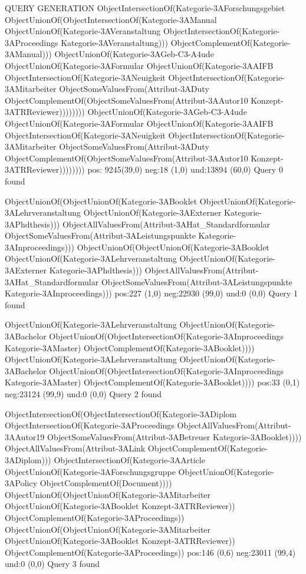 QUERY GENERATION
ObjectIntersectionOf(Kategorie-3AForschungsgebiet ObjectUnionOf(ObjectIntersectionOf(Kategorie-3AManual ObjectUnionOf(Kategorie-3AVeranstaltung ObjectIntersectionOf(Kategorie-3AProceedings Kategorie-3AVeranstaltung))) ObjectComplementOf(Kategorie-3AManual)))
ObjectUnionOf(Kategorie-3AGeb-C3-A4ude ObjectUnionOf(Kategorie-3AFormular ObjectUnionOf(Kategorie-3AAIFB ObjectIntersectionOf(Kategorie-3ANeuigkeit ObjectIntersectionOf(Kategorie-3AMitarbeiter ObjectSomeValuesFrom(Attribut-3ADuty ObjectComplementOf(ObjectSomeValuesFrom(Attribut-3AAutor10 Konzept-3ATRReviewer))))))))
ObjectUnionOf(Kategorie-3AGeb-C3-A4ude ObjectUnionOf(Kategorie-3AFormular ObjectUnionOf(Kategorie-3AAIFB ObjectIntersectionOf(Kategorie-3ANeuigkeit ObjectIntersectionOf(Kategorie-3AMitarbeiter ObjectSomeValuesFrom(Attribut-3ADuty ObjectComplementOf(ObjectSomeValuesFrom(Attribut-3AAutor10 Konzept-3ATRReviewer))))))))
pos: 9245(39,0)		 neg:18 (1,0)		 und:13894 (60,0)
Query 0 found

ObjectUnionOf(ObjectUnionOf(Kategorie-3ABooklet ObjectUnionOf(Kategorie-3ALehrveranstaltung ObjectUnionOf(Kategorie-3AExterner Kategorie-3APhdthesis))) ObjectAllValuesFrom(Attribut-3AHat_Standardformular ObjectSomeValuesFrom(Attribut-3ALeistungspunkte Kategorie-3AInproceedings)))
ObjectUnionOf(ObjectUnionOf(Kategorie-3ABooklet ObjectUnionOf(Kategorie-3ALehrveranstaltung ObjectUnionOf(Kategorie-3AExterner Kategorie-3APhdthesis))) ObjectAllValuesFrom(Attribut-3AHat_Standardformular ObjectSomeValuesFrom(Attribut-3ALeistungspunkte Kategorie-3AInproceedings)))
pos:227 (1,0)		 neg:22930 (99,0)		 und:0 (0,0)
Query 1 found

ObjectUnionOf(Kategorie-3ALehrveranstaltung ObjectUnionOf(Kategorie-3ABachelor ObjectUnionOf(ObjectIntersectionOf(Kategorie-3AInproceedings Kategorie-3AMaster) ObjectComplementOf(Kategorie-3ABooklet))))
ObjectUnionOf(Kategorie-3ALehrveranstaltung ObjectUnionOf(Kategorie-3ABachelor ObjectUnionOf(ObjectIntersectionOf(Kategorie-3AInproceedings Kategorie-3AMaster) ObjectComplementOf(Kategorie-3ABooklet))))
pos:33 (0,1)		 neg:23124 (99,9)		 und:0 (0,0)
Query 2 found

ObjectIntersectionOf(ObjectIntersectionOf(Kategorie-3ADiplom ObjectIntersectionOf(Kategorie-3AProceedings ObjectAllValuesFrom(Attribut-3AAutor19 ObjectSomeValuesFrom(Attribut-3ABetreuer Kategorie-3ABooklet)))) ObjectAllValuesFrom(Attribut-3ALink ObjectComplementOf(Kategorie-3ADiplom)))
ObjectIntersectionOf(Kategorie-3AArticle ObjectUnionOf(Kategorie-3AForschungsgruppe ObjectUnionOf(Kategorie-3APolicy ObjectComplementOf(Document))))
ObjectUnionOf(ObjectUnionOf(Kategorie-3AMitarbeiter ObjectUnionOf(Kategorie-3ABooklet Konzept-3ATRReviewer)) ObjectComplementOf(Kategorie-3AProceedings))
ObjectUnionOf(ObjectUnionOf(Kategorie-3AMitarbeiter ObjectUnionOf(Kategorie-3ABooklet Konzept-3ATRReviewer)) ObjectComplementOf(Kategorie-3AProceedings))
pos:146 (0,6)		 neg:23011 (99,4)		 und:0 (0,0)
Query 3 found

